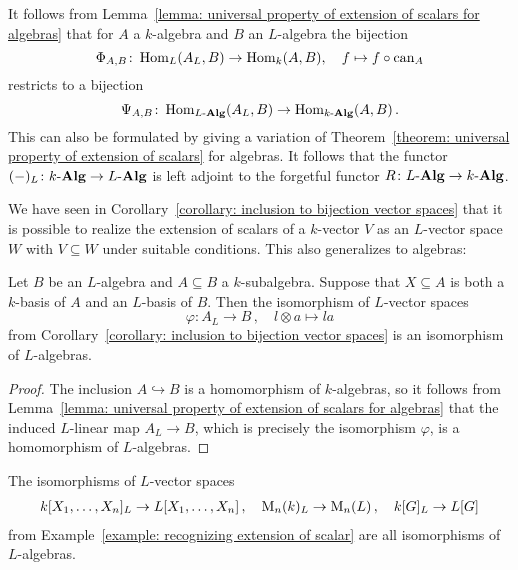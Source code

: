 \begin{remark}
  It follows from Lemma~\ref{lemma: universal property of extension of scalars for algebras} that for $A$ a $k$-algebra and $B$ an $L$-algebra the bijection
  \[
            \Phi_{A,B}
    \colon  \operatorname{Hom}_L(A_L, B)
    \to     \operatorname{Hom}_k(A, B),
    \quad   f
    \mapsto f \circ \operatorname{can}_A
  \]
  restricts to a bijection
  \[
            \Psi_{A,B}
    \colon  \operatorname{Hom}_{L\text{-}\mathbf{Alg}}(A_L, B)
    \to     \operatorname{Hom}_{k\text{-}\mathbf{Alg}}(A, B) \,.
  \]
  This can also be formulated by giving a variation of Theorem~\ref{theorem: universal property of extension of scalars} for algebras.
  It follows that the functor $(-)_L \colon k\text{-}\mathbf{Alg} \to L\text{-}\mathbf{Alg}$ is left adjoint to the forgetful functor $R \colon L\text{-}\mathbf{Alg} \to k\text{-}\mathbf{Alg}$.
\end{remark}


\begin{fluff}
  We have seen in Corollary~\ref{corollary: inclusion to bijection vector spaces} that it is possible to realize the extension of scalars of a $k$-vector $V$ as an $L$-vector space $W$ with $V \subseteq W$ under suitable conditions.
  This also generalizes to algebras:
\end{fluff}


\begin{corollary}
\label{corollary: inclusion to bijection algebras}
  Let $B$ be an $L$-algebra and $A \subseteq B$ a $k$-subalgebra.
  Suppose that $X \subseteq A$ is both a $k$-basis of $A$ and an $L$-basis of $B$.
  Then the isomorphism of $L$-vector spaces
  \[
            \varphi
    \colon  A_L
    \to     B \,,
    \quad   l \otimes a
    \mapsto l a
  \]
  from Corollary~\ref{corollary: inclusion to bijection vector spaces} is an isomorphism of $L$-algebras.
\end{corollary}
\begin{proof}
  The inclusion $A \hookrightarrow B$ is a homomorphism of $k$-algebras, so it follows from Lemma~\ref{lemma: universal property of extension of scalars for algebras} that the induced $L$-linear map $A_L \to B$, which is precisely the isomorphism $\varphi$, is a homomorphism of $L$-algebras.
\end{proof}


\begin{example}
  The isomorphisms of $L$-vector spaces
  \begin{gather*}
    k[X_1, \dotsc, X_n]_L \to L[X_1, \dotsc, X_n] \,,
    \quad
    \operatorname{M}_n(k)_L \to \operatorname{M}_n(L) \,,
    \quad
    k[G]_L \to L[G]
  \end{gather*}
  from Example~\ref{example: recognizing extension of scalar} are all isomorphisms of $L$-algebras.
\end{example}


